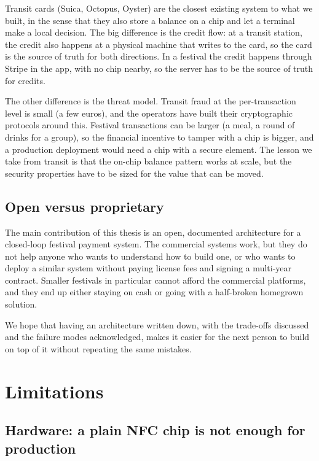 Transit cards (Suica, Octopus, Oyster) are the closest existing system to what we built, in the sense that they also store a balance on a chip and let a terminal make a local decision. The big difference is the credit flow: at a transit station, the credit also happens at a physical machine that writes to the card, so the card is the source of truth for both directions. In a festival the credit happens through Stripe in the app, with no chip nearby, so the server has to be the source of truth for credits.

The other difference is the threat model. Transit fraud at the per-transaction level is small (a few euros), and the operators have built their cryptographic protocols around this. Festival transactions can be larger (a meal, a round of drinks for a group), so the financial incentive to tamper with a chip is bigger, and a production deployment would need a chip with a secure element. The lesson we take from transit is that the on-chip balance pattern works at scale, but the security properties have to be sized for the value that can be moved.

\subsection{Open versus proprietary}
\label{subsec:open-vs-proprietary}

The main contribution of this thesis is an open, documented architecture for a closed-loop festival payment system. The commercial systems work, but they do not help anyone who wants to understand how to build one, or who wants to deploy a similar system without paying license fees and signing a multi-year contract. Smaller festivals in particular cannot afford the commercial platforms, and they end up either staying on cash or going with a half-broken homegrown solution.

We hope that having an architecture written down, with the trade-offs discussed and the failure modes acknowledged, makes it easier for the next person to build on top of it without repeating the same mistakes.

\section{Limitations}
\label{sec:limitations-discussion}

\subsection{Hardware: a plain NFC chip is not enough for production}
\label{subsec:limitation-hardware}

